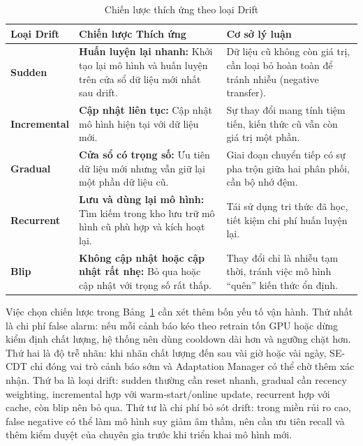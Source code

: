\begin{table}[H]
	\centering
	\caption{Chiến lược thích ứng theo loại Drift}
	\label{tab:adaptation-strategies}
	\begin{tabular}{|l|p{5.5cm}|p{5cm}|}
		\hline
		\textbf{Loại Drift}  & \textbf{Chiến lược Thích ứng}                                                                                               & \textbf{Cơ sở lý luận}                                                                  \\
		\hline
		\textbf{Sudden}      & \textbf{Huấn luyện lại nhanh:} Khởi tạo lại mô hình và huấn luyện trên cửa sổ dữ liệu mới nhất sau drift.                & Dữ liệu cũ không còn giá trị, cần loại bỏ hoàn toàn để tránh nhiễu (negative transfer). \\
		\hline
		\textbf{Incremental} & \textbf{Cập nhật liên tục:} Cập nhật mô hình hiện tại với dữ liệu mới.                        & Sự thay đổi mang tính tiệm tiến, kiến thức cũ vẫn còn giá trị một phần.                 \\
		\hline
		\textbf{Gradual}     & \textbf{Cửa sổ có trọng số:} Ưu tiên dữ liệu mới nhưng vẫn giữ lại một phần dữ liệu cũ. & Giai đoạn chuyển tiếp có sự pha trộn giữa hai phân phối, cần bộ nhớ đệm.                \\
		\hline
		\textbf{Recurrent}   & \textbf{Lưu và dùng lại mô hình:} Tìm kiếm trong kho lưu trữ mô hình cũ phù hợp và kích hoạt lại.                            & Tái sử dụng tri thức đã học, tiết kiệm chi phí huấn luyện lại.                          \\
		\hline
		\textbf{Blip}        & \textbf{Không cập nhật hoặc cập nhật rất nhẹ:} Bỏ qua hoặc cập nhật với trọng số rất thấp.                                            & Thay đổi chỉ là nhiễu tạm thời, tránh việc mô hình ``quên'' kiến thức ổn định.            \\
		\hline
	\end{tabular}
\end{table}

Việc chọn chiến lược trong Bảng~\ref{tab:adaptation-strategies} cần xét thêm bốn yếu tố vận hành. Thứ nhất là chi phí false alarm: nếu mỗi cảnh báo kéo theo retrain tốn GPU hoặc dừng kiểm định chất lượng, hệ thống nên dùng cooldown dài hơn và ngưỡng chặt hơn. Thứ hai là độ trễ nhãn: khi nhãn chất lượng đến sau vài giờ hoặc vài ngày, SE-CDT chỉ đóng vai trò cảnh báo sớm và Adaptation Manager có thể chờ thêm xác nhận. Thứ ba là loại drift: sudden thường cần reset nhanh, gradual cần recency weighting, incremental hợp với warm-start/online update, recurrent hợp với cache, còn blip nên bỏ qua. Thứ tư là chi phí bỏ sót drift: trong miền rủi ro cao, false negative có thể làm mô hình suy giảm âm thầm, nên cần ưu tiên recall và thêm kiểm duyệt của chuyên gia trước khi triển khai mô hình mới.


